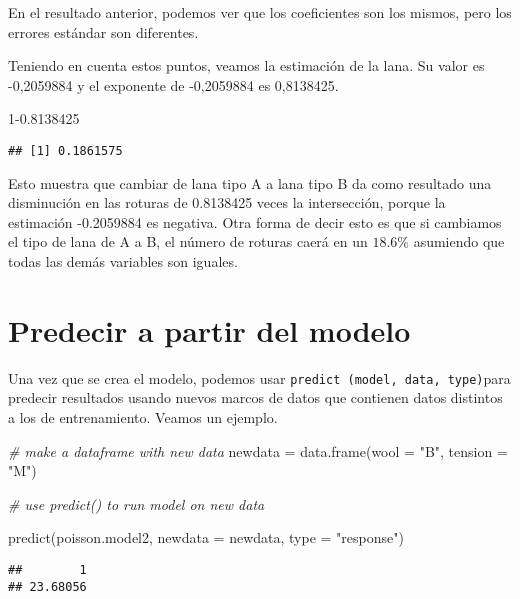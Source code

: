 \documentclass[
]{book}
\newenvironment{Shaded}{\begin{snugshade}}{\end{snugshade}}
\newcommand{\AttributeTok}[1]{\textcolor[rgb]{0.77,0.63,0.00}{#1}}
\newcommand{\CommentTok}[1]{\textcolor[rgb]{0.56,0.35,0.01}{\textit{#1}}}
\newcommand{\DecValTok}[1]{\textcolor[rgb]{0.00,0.00,0.81}{#1}}
\newcommand{\FloatTok}[1]{\textcolor[rgb]{0.00,0.00,0.81}{#1}}
\newcommand{\FunctionTok}[1]{\textcolor[rgb]{0.00,0.00,0.00}{#1}}
\newcommand{\NormalTok}[1]{#1}
\newcommand{\OtherTok}[1]{\textcolor[rgb]{0.56,0.35,0.01}{#1}}
\newcommand{\StringTok}[1]{\textcolor[rgb]{0.31,0.60,0.02}{#1}}
\begin{document}
En el resultado anterior, podemos ver que los coeficientes son los mismos, pero los errores estándar son diferentes.

Teniendo en cuenta estos puntos, veamos la estimación de la lana. Su valor es -0,2059884 y el exponente de -0,2059884 es 0,8138425.

\begin{Shaded}
\begin{Highlighting}[]
\DecValTok{1}\FloatTok{{-}0.8138425}
\end{Highlighting}
\end{Shaded}

\begin{verbatim}
## [1] 0.1861575
\end{verbatim}

Esto muestra que cambiar de lana tipo A a lana tipo B da como resultado una disminución en las roturas de 0.8138425 veces la intersección, porque la estimación -0.2059884 es negativa. Otra forma de decir esto es que si cambiamos el tipo de lana de A a B, el número de roturas caerá en un \(18.6\%\) asumiendo que todas las demás variables son iguales.

\hypertarget{predecir-a-partir-del-modelo}{%
\chapter{Predecir a partir del modelo}\label{predecir-a-partir-del-modelo}}

Una vez que se crea el modelo, podemos usar \texttt{predict\ (model,\ data,\ type)}para predecir resultados usando nuevos marcos de datos que contienen datos distintos a los de entrenamiento. Veamos un ejemplo.

\begin{Shaded}
\begin{Highlighting}[]
\CommentTok{\# make a dataframe with new data}
\NormalTok{newdata }\OtherTok{=} \FunctionTok{data.frame}\NormalTok{(}\AttributeTok{wool =} \StringTok{"B"}\NormalTok{, }\AttributeTok{tension =} \StringTok{"M"}\NormalTok{)}

\CommentTok{\# use \textquotesingle{}predict()\textquotesingle{} to run model on new data}

\FunctionTok{predict}\NormalTok{(poisson.model2, }\AttributeTok{newdata =}\NormalTok{ newdata, }\AttributeTok{type =} \StringTok{"response"}\NormalTok{)}
\end{Highlighting}
\end{Shaded}

\begin{verbatim}
##        1 
## 23.68056
\end{verbatim}
\end{document}
